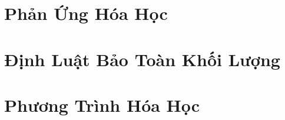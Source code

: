 \documentclass{article}
\numberwithin{equation}{section}
\begin{document}
\section{Phản Ứng Hóa Học}


\section{Định Luật Bảo Toàn Khối Lượng}


\section{Phương Trình Hóa Học}


\printbibliography[heading=bibintoc]
	
\end{document}
